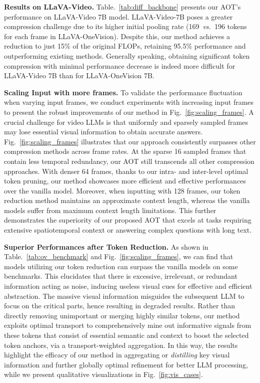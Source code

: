 \noindent \textbf{Results on LLaVA-Video.} Table.~\ref{tab:diff_backbone} presents our AOT's performance on LLaVA-Video 7B model. 
%
LLaVA-Video-7B poses a greater compression challenge due to its higher initial pooling rate (169~\textit{vs.}~196 tokens for each frame in LLaVA-OneVision). Despite this, our method achieves a reduction to just 15\% of the original FLOPs, retaining 95.5\% performance and outperforming existing methods. 
Generally speaking, obtaining significant token compression with minimal performance decrease is indeed more difficult for LLaVA-Video 7B than for LLaVA-OneVision 7B.


\noindent \textbf{Scaling Input with more frames.}
To validate the performance fluctuation when varying input frames, we conduct experiments with increasing input frames to present the robust improvements of our method in Fig.~\ref{fig:scaling_frames}. A crucial challenge for video LLMs is that uniformly and sparsely sampled frames may lose essential visual information to obtain accurate answers. 
%
Fig.~\ref{fig:scaling_frames} illustrates that our approach consistently surpasses other compression methods across frame rates. 
At the sparse 16 sampled frames that contain less temporal redundancy, our AOT still transcends all other compression approaches. With denser 64 frames, thanks to our intra- and inter-level optimal token pruning, our method showcases more efficient and effective performances over the vanilla model. Moreover, when inputting with 128 frames, our token reduction method maintains an approximate context length, whereas the vanilla models suffer from maximum context length limitations. This further demonstrates the superiority of our proposed AOT that excels at tasks requiring extensive spatiotemporal context or answering complex questions with long text.



\noindent \textbf{Superior Performances after Token Reduction.}
As shown in Table.~\ref{tab:ov_benchmark} and Fig.~\ref{fig:scaling_frames}, we can find that models utilizing our token reduction can surpass the vanilla models on some benchmarks. This elucidates that there is excessive, irrelevant, or redundant information acting as noise, inducing useless visual cues for effective and efficient abstraction. The massive visual information misguides the subsequent LLM to focus on the critical parts, hence resulting in degraded results. Rather than directly removing unimportant or merging highly similar tokens, our method exploits optimal transport to comprehensively mine out informative signals from these tokens that consist of essential semantic and context to boost the selected token anchors, via a transport-weighted aggregation. In this way, the results highlight the efficacy of our method in aggregating or \textit{distilling} key visual information and further globally optimal refinement for better LLM processing, while we present qualitative visualizations in Fig.~\ref{fig:vis_cases}.



